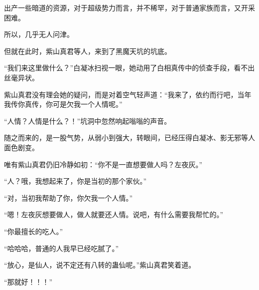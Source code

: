 \begin{this_body}
出产一些暗道的资源，对于超级势力而言，并不稀罕，对于普通家族而言，又开采困难。

所以，几乎无人问津。

但就在此时，紫山真君等人，来到了黑魔天坑的坑底。

“我们来这里做什么？”白凝冰扫视一眼，她动用了白相真传中的侦查手段，看不出丝毫异状。

紫山真君没有理会她的疑问，而是对着空气轻声道：“我来了，依约而行吧，当年我传你真传，你可是欠我一个人情呢。”

“人情？人情是什么？！”坑洞中忽然响起嗡嗡的声音。

随之而来的，是一股气势，从弱小到强大，转眼间，已经压得白凝冰、影无邪等人面色剧变。

唯有紫山真君仍旧冷静如初：“你不是一直想要做人吗？左夜灰。”

“人？哦，我想起来了，你是当初的那个家伙。”

“对，当初我帮助了你，你欠我一个人情。”

“嗯！左夜灰想要做人，做人就要还人情。说吧，有什么需要我帮忙的。”

“你最擅长的吃人。”

“哈哈哈，普通的人我早已经吃腻了。”

“放心，是仙人，说不定还有八转的蛊仙呢。”紫山真君笑着道。

“那就好！！！”

\end{this_body}


